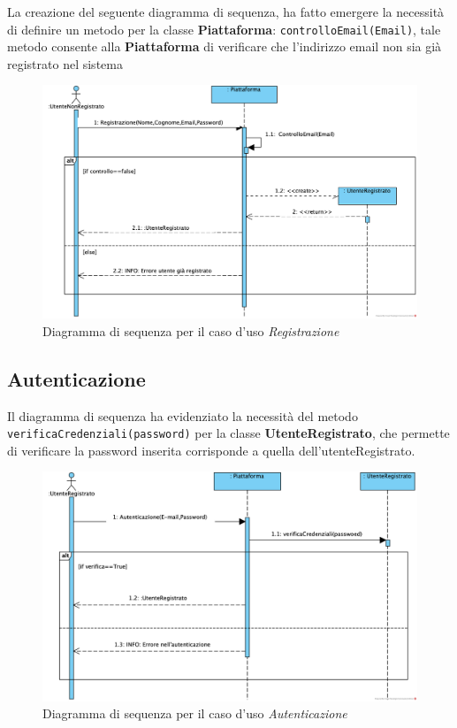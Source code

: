 La creazione del seguente diagramma di sequenza, ha fatto emergere la necessità di definire un metodo per la classe \textbf{Piattaforma}: \texttt{controlloEmail(Email)}, tale metodo consente alla \textbf{Piattaforma} di verificare che l'indirizzo email non sia già registrato nel sistema
\begin{figure}[H]
    \centering
    \includegraphics[width=0.8\linewidth]{assets/casid'uso/Registrazione.png}
    \caption{Diagramma di sequenza per il caso d'uso \emph{Registrazione}}
    \label{fig:registrazione}
\end{figure}

\subsection{Autenticazione}
Il diagramma di sequenza ha evidenziato la necessità del metodo \texttt{verificaCredenziali(password)} per la classe \textbf{UtenteRegistrato}, che permette di verificare la password inserita corrisponde a quella dell'utenteRegistrato.
\begin{figure}[H]
	\centering
    \includegraphics[width=0.8\linewidth]{assets/casid'uso/Autenticazione.png}
    \caption{Diagramma di sequenza per il caso d'uso \emph{Autenticazione}}
    \label{fig:autenticazione}
\end{figure}

